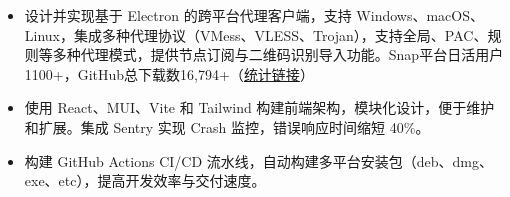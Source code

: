 \documentclass{resume}
\newcommand{\en}[1]{}
\newcommand{\zh}[1]{#1}
\begin{document}
\en{\datedsubsection{\textbf{\href{https://github.com/shaonhuang/V2rayX/tree/v0.4.5}{V2rayX (Electron Version)}}}{}}
\zh{}
\begin{itemize}
    \item \en{Designed and developed a cross-platform proxy client built on Electron, supporting Windows, macOS, and Linux. Integrated multiple proxy protocols (VMess, VLESS, Trojan) with support for various proxy modes. Achieved 1,100+ daily active users on Snap platform and 16,794+ total GitHub downloads.}
          \zh{设计并实现基于 Electron 的跨平台代理客户端，支持 Windows、macOS、Linux，集成多种代理协议（VMess、VLESS、Trojan），支持全局、PAC、规则等多种代理模式，提供节点订阅与二维码识别导入功能。Snap平台日活用户1100+，GitHub总下载数16,794+（\href{https://tooomm.github.io/github-release-stats/?username=shaonhuang&repository=V2rayX}{统计链接}）}
    \item \en{Built a modular and scalable frontend architecture with React, MUI, Vite, and Tailwind CSS. Integrated Sentry for crash monitoring, reducing error response time by 40\%.}
          \zh{使用 React、MUI、Vite 和 Tailwind 构建前端架构，模块化设计，便于维护和扩展。集成 Sentry 实现 Crash 监控，错误响应时间缩短 40\%。}
    \item \en{Developed a fully automated CI/CD pipeline with GitHub Actions, supporting multi-platform packaging (deb, dmg, exe, etc.), significantly improving development efficiency.}
          \zh{构建 GitHub Actions CI/CD 流水线，自动构建多平台安装包（deb、dmg、exe、etc），提高开发效率与交付速度。}
\end{itemize}
\end{document}
